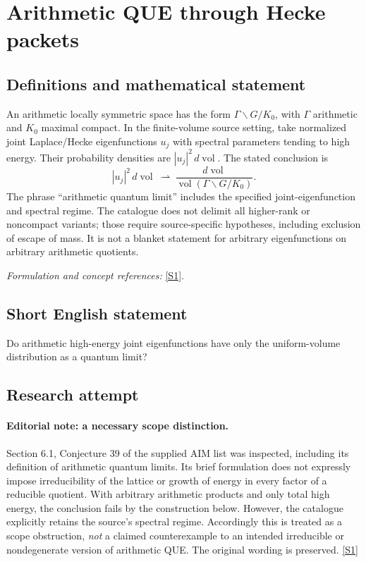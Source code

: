 \documentclass[11pt,a4paper]{article}
\newcommand{\sref}[2]{\hyperlink{source:#1:#2}{[S#2]}}
\newif\ifshowcatalogue
\newcommand{\cataloguescope}[1]{\ifshowcatalogue
 \paragraph{Exact scope in the supplied catalogue.}
 \begin{quote}\small #1\end{quote}\fi}
\numberwithin{equation}{section}
\begin{document}
\setcounter{section}{0}
\clearpage
\section*{\texorpdfstring{Arithmetic QUE through Hecke packets}{Arithmetic QUE through Hecke packets}}\label{statement}
\subsection{Definitions and mathematical statement}
An arithmetic locally symmetric space has the form $\Gamma\backslash G/K_0$, with $\Gamma$ arithmetic and $K_0$ maximal compact. In the finite-volume source setting, take normalized joint Laplace/Hecke eigenfunctions $u_j$ with spectral parameters tending to high energy. Their probability densities are $|u_j|^2\,d\operatorname{vol}$. The stated conclusion is
\[
 |u_j|^2\,d\operatorname{vol}\ \rightharpoonup\
 \frac{d\operatorname{vol}}{\operatorname{vol}(\Gamma\backslash G/K_0)}.
\]
The phrase ``arithmetic quantum limit'' includes the specified joint-eigenfunction and spectral regime. The catalogue does not delimit all higher-rank or noncompact variants; those require source-specific hypotheses, including exclusion of escape of mass. It is not a blanket statement for arbitrary eigenfunctions on arbitrary arithmetic quotients.
\par\smallskip\textit{Formulation and concept references:} \sref{statement}{1}.
\cataloguescope{Prove the arithmetic quantum unique ergodicity conjecture: for arithmetic locally symmetric spaces, the normalized Riemannian volume is the only arithmetic quantum limit of Hecke eigenfunctions.}
\subsection{Short English statement}
Do arithmetic high-energy joint eigenfunctions have only the uniform-volume distribution as a quantum limit?
\subsection{Research attempt}

\paragraph{Editorial note: a necessary scope distinction.}
Section 6.1, Conjecture 39 of the supplied AIM list was inspected, including
its definition of arithmetic quantum limits. Its brief formulation does
not expressly impose irreducibility of the lattice or growth of energy in
every factor of a reducible quotient. With arbitrary arithmetic products
and only total high energy, the conclusion fails by the construction below.
However, the catalogue explicitly retains the source's spectral regime.
Accordingly this is treated as a scope obstruction, \emph{not} a claimed
counterexample to an intended irreducible or nondegenerate version of
arithmetic QUE. The original wording is preserved. \sref{statement}{1}
\end{document}
